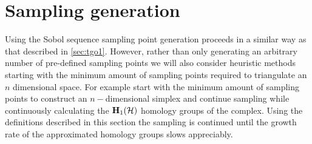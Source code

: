 \section{Sampling generation}
Using the Sobol sequence sampling point generation proceeds in a similar way as that described in \autoref{sec:tgo1}. However, rather than only generating an arbitrary number of pre-defined sampling points we will also consider heuristic methods starting with the minimum amount of sampling points required to triangulate an $n$ dimensional space. For example start with the minimum amount of sampling points to construct an $n-$dimensional simplex and continue sampling while continuously calculating the $\bold{H}_1 (\mathcal{H})$ homology groups of the complex. Using the definitions described in this section the sampling is continued until the growth rate of the approximated homology groups slows appreciably. %





